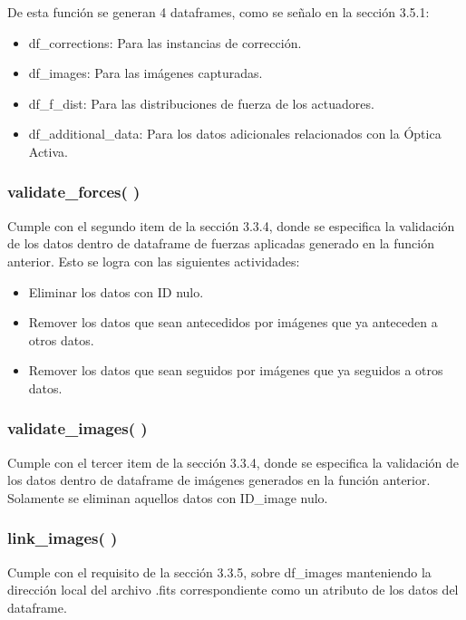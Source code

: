 De esta función se generan 4 dataframes, como se señalo en la sección 3.5.1: 

\begin{itemize}
    \item df\_corrections: Para las instancias de corrección.
    
    \item df\_images: Para las imágenes capturadas.

    \item df\_f\_dist: Para las distribuciones de fuerza de los actuadores.

    \item df\_additional\_data: Para los datos adicionales relacionados con la Óptica Activa.
\end{itemize}

\subsubsection{validate\_forces( )} 
Cumple con el segundo item de la sección 3.3.4, donde se especifica la validación de los datos dentro de dataframe de fuerzas aplicadas generado en la función anterior. Esto se logra con las siguientes actividades:

\begin{itemize}
    \item Eliminar los datos con ID nulo.

    \item Remover los datos que sean antecedidos por imágenes que ya anteceden a otros datos.

    \item Remover los datos que sean seguidos por imágenes que ya seguidos a otros datos.
\end{itemize}

\subsubsection{validate\_images( )} 
Cumple con el tercer item de la sección 3.3.4, donde se especifica la validación de los datos dentro de dataframe de imágenes generados en la función anterior. Solamente se eliminan aquellos datos con ID\_image nulo.

\subsubsection{link\_images( )} 
Cumple con el requisito de la sección 3.3.5, sobre df\_images manteniendo la dirección local del archivo .fits correspondiente como un atributo de los datos del dataframe.

